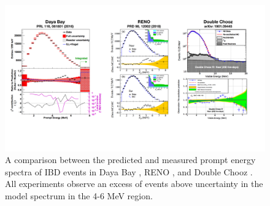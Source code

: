 \begin{figure}[t]
	\centering
	\includegraphics[width=1\linewidth]{tex/3-reactorneutrinos-images/Spectrums}
	\caption[Spectrums.]{A comparison between the predicted and measured prompt energy spectra of IBD events in Daya Bay \cite{DayaBayAnomaly}, RENO \cite{Seo:2016uom}, and Double Chooz \cite{DoubleChooz:2019qbj}. All experiments observe an excess of events above uncertainty in the model spectrum in the 4-6 MeV region.}
	\label{fig:spectrums}
\end{figure}



